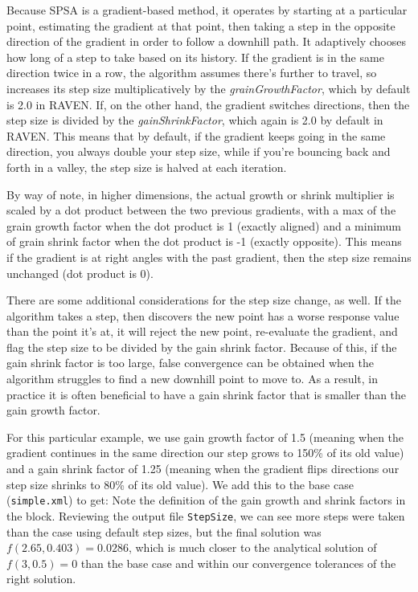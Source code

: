 Because SPSA is a gradient-based method, it operates by starting at a particular point, estimating the
gradient at that point, then taking a step in the opposite direction of the gradient in order to follow a
downhill path.  It adaptively chooses how long of a step to take based on its history.  If the gradient is in
the same direction twice in a row, the algorithm assumes there's further to travel, so increases its step size
multiplicatively by the \emph{grainGrowthFactor}, which by default is 2.0 in RAVEN.  If, on the other hand,
the gradient switches directions, then the step size is divided by the \emph{gainShrinkFactor}, which again is
2.0 by default in RAVEN.  This means that by default, if the gradient keeps going in the same direction, you
always double your step size, while if you're bouncing back and forth in a valley, the step size is halved at
each iteration.

By way of note, in higher dimensions, the actual growth or shrink multiplier is scaled by a dot product
between the two previous gradients, with a max of the grain growth factor when the dot product is 1 (exactly
aligned) and a minimum of grain shrink factor when the dot product is -1 (exactly opposite).  This means if
the gradient is at right angles with the past gradient, then the step size remains unchanged (dot product is
0).

There are some additional considerations for the step size change, as well.  If the algorithm takes a step,
then discovers the new point has a worse response value than the point it's at, it will reject the new point,
re-evaluate the gradient, and flag the step size to be divided by the gain shrink factor.  Because of this, if
the gain shrink factor is too large, false convergence can be obtained when the algorithm struggles to find a
new downhill point to move to.  As a result, in practice it is often beneficial to have a gain shrink factor
that is smaller than the gain growth factor.

For this particular example, we use gain growth factor of 1.5 (meaning when the gradient continues in the same
direction our step grows to 150\% of its old value) and a gain shrink factor of 1.25 (meaning when the
gradient flips directions our step size shrinks to 80\% of its old value).  We add this to the base case
(\texttt{simple.xml}) to get:
Note the definition of the gain growth and shrink factors in the  block.  Reviewing the
output file \texttt{StepSize}, we can see more steps were taken than the case using default step sizes, but
the final solution was $f(2.65,0.403)=0.0286$, which is much closer to the analytical solution of $f(3,0.5)=0$
than the base case and within our convergence tolerances of the right solution.

